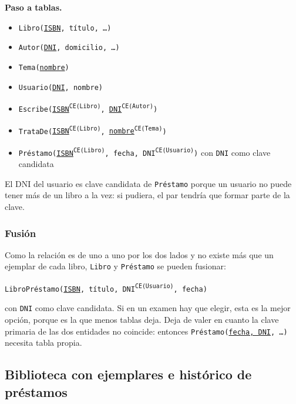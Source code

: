 \textbf{Paso a tablas.}

\begin{itemize}[leftmargin=*]
    \item \texttt{Libro(\underline{ISBN}, título, \dots)}
    \item \texttt{Autor(\underline{DNI}, domicilio, \dots)}
    \item \texttt{Tema(\underline{nombre})}
    \item \texttt{Usuario(\underline{DNI}, nombre)}
    \item \texttt{Escribe(\underline{ISBN}\textsuperscript{CE(Libro)},
          \underline{DNI}\textsuperscript{CE(Autor)})}
    \item \texttt{TrataDe(\underline{ISBN}\textsuperscript{CE(Libro)},
          \underline{nombre}\textsuperscript{CE(Tema)})}
    \item \texttt{Préstamo(\underline{ISBN}\textsuperscript{CE(Libro)}, fecha,
          DNI\textsuperscript{CE(Usuario)})} con \texttt{DNI} como clave
          candidata
\end{itemize}

El DNI del usuario es clave candidata de \texttt{Préstamo} porque un usuario no
puede tener más de un libro a la vez: si pudiera, el par tendría que formar
parte de la clave.

\subsubsection*{Fusión}

Como la relación es de uno a uno por los dos lados y no existe más que un
ejemplar de cada libro, \texttt{Libro} y \texttt{Préstamo} se pueden fusionar:

\begin{center}
\texttt{LibroPréstamo(\underline{ISBN}, título, DNI\textsuperscript{CE(Usuario)}, fecha)}
\end{center}

con \texttt{DNI} como clave candidata. Si en un examen hay que elegir, esta es
la mejor opción, porque es la que menos tablas deja. Deja de valer en cuanto la
clave primaria de las dos entidades no coincide: entonces
\texttt{Préstamo(\underline{fecha, DNI}, \dots)} necesita tabla propia.

\subsection{Biblioteca con ejemplares e histórico de préstamos}


